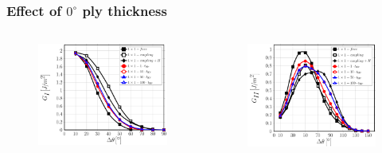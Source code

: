 \documentclass[first,firstsupp,lastsupp,last,hyperref,table]{ETHclass}
\begin{document}
\begin{frame}
\frametitle{\vspace{0.2cm}\small Effect of $0^{\circ}$ ply thickness}
\vspace{-.75cm}
\centering
\begin{columns}[c]
\centering
\begin{column}{0.5\textwidth}
\centering
\begin{figure}
\centering
\includegraphics[width=\columnwidth]{1x1-i-vf60-GI.pdf}
\end{figure}
\end{column}
\begin{column}{0.5\textwidth}
\centering
\begin{figure}
\centering
\includegraphics[width=\columnwidth]{1x1-i-vf60-GII.pdf}

\end{figure}
\end{column}
\end{columns}
\end{frame}
\end{document}
